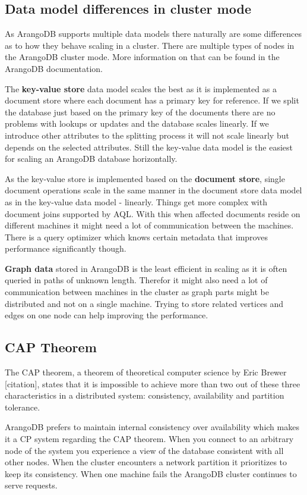 \subsection{Data model differences in cluster mode}
As ArangoDB supports multiple data models there naturally are some differences as to how they behave scaling in a cluster. There are multiple types of nodes in the ArangoDB cluster mode. More information on that can be found in the ArangoDB documentation.
\medskip

The \textbf{key-value store} data model scales the best as it is implemented as a document store where each document has a primary key for reference. If we split the database just based on the primary key of the documents there are no problems with lookups or updates and the database scales linearly. If we introduce other attributes to the splitting process it will not scale linearly but depends on the selected attributes. Still the key-value data model is the easiest for scaling an ArangoDB database horizontally.
\medskip

As the key-value store is implemented based on the \textbf{document store}, single document operations scale in the same manner in the document store data model as in the key-value data model - linearly. Things get more complex with document joins supported by AQL. With this when affected documents reside on different machines it might need a lot of communication between the machines. There is a query optimizer which knows certain metadata that improves performance significantly though.
\medskip

\textbf{Graph data} stored in ArangoDB is the least efficient in scaling as it is often queried in paths of unknown length. Therefor it might also need a lot of communication between machines in the cluster as graph parts might be distributed and not on a single machine. Trying to store related vertices and edges on one node can help improving the performance.
\cite{ArangoCluster}

\subsection{CAP Theorem}
The CAP theorem, a theorem of theoretical computer science by Eric Brewer [citation], states that it is impossible to achieve more than two out of these three characteristics in a distributed system: consistency, availability and partition tolerance.

ArangoDB prefers to maintain internal consistency over availability which makes it a CP system regarding the CAP theorem. When you connect to an arbitrary node of the system you experience a view of the database consistent with all other nodes. When the cluster encounters a network partition it prioritizes to keep its consistency. When one machine fails the ArangoDB cluster continues to serve requests.
\cite{ArangoCluster}

